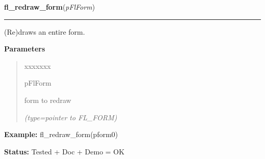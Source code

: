\hspace{.8\funcindent}\begin{boxedminipage}{\funcwidth}

    \raggedright \textbf{fl\_redraw\_form}(\textit{pFlForm})

    \vspace{-1.5ex}

    \rule{\textwidth}{0.5\fboxrule}
\setlength{\parskip}{2ex}
    (Re)draws an entire form.

\setlength{\parskip}{1ex}
      \textbf{Parameters}
      \vspace{-1ex}

      \begin{quote}
        \begin{Ventry}{xxxxxxx}

          \item[pFlForm]

          form to redraw

            {\it (type=pointer to FL\_FORM)}

        \end{Ventry}

      \end{quote}

\textbf{Example:} fl\_redraw\_form(pform0)



\textbf{Status:} Tested + Doc + Demo = OK



    \end{boxedminipage}

    \label{xformslib:flbasic:fl_set_form_dblbuffer}

    \vspace{0.5ex}

